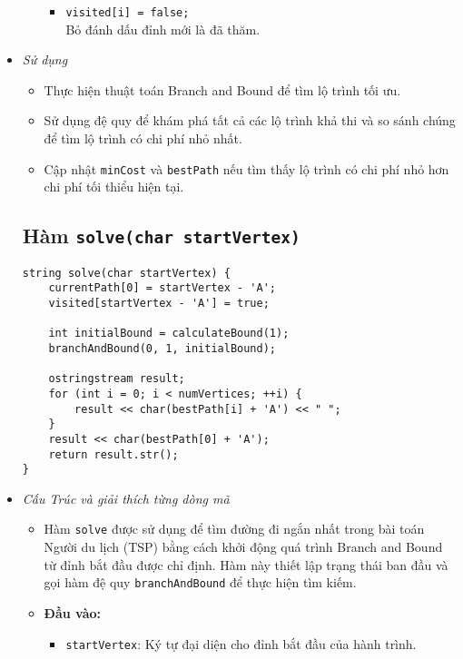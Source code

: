 \documentclass[a4paper]{article}
\begin{document}
\begin{itemize}
\begin{itemize}
\begin{itemize}
        \item \texttt{visited[i] = false;} \\ 
        Bỏ đánh dấu đỉnh mới là đã thăm.
    \end{itemize}
\end{itemize}
\item \textit{Sử dụng}
\begin{itemize}
    \item Thực hiện thuật toán Branch and Bound để tìm lộ trình tối ưu.
    \item Sử dụng đệ quy để khám phá tất cả các lộ trình khả thi và so sánh chúng để tìm lộ trình có chi phí nhỏ nhất.
    \item Cập nhật \texttt{minCost} và \texttt{bestPath} nếu tìm thấy lộ trình có chi phí nhỏ hơn chi phí tối thiểu hiện tại.
\end{itemize}

\subsection*{Hàm \texttt{solve(char startVertex)}}
\begin{lstlisting}[style=cppstyle]
string solve(char startVertex) {
    currentPath[0] = startVertex - 'A';
    visited[startVertex - 'A'] = true;

    int initialBound = calculateBound(1);
    branchAndBound(0, 1, initialBound);

    ostringstream result;
    for (int i = 0; i < numVertices; ++i) {
        result << char(bestPath[i] + 'A') << " ";
    }
    result << char(bestPath[0] + 'A');
    return result.str();
}
\end{lstlisting}
\item \textit{Cấu Trúc và giải thích từng dòng mã}
\begin{itemize}
    \item Hàm \texttt{solve} được sử dụng để tìm đường đi ngắn nhất trong bài toán Người du lịch (TSP) bằng cách khởi động quá trình Branch and Bound từ đỉnh bắt đầu được chỉ định. Hàm này thiết lập trạng thái ban đầu và gọi hàm đệ quy \texttt{branchAndBound} để thực hiện tìm kiếm.
\end{itemize}

\begin{itemize}
    \item \textbf{Đầu vào:}
    \begin{itemize}
        \item \texttt{startVertex}: Ký tự đại diện cho đỉnh bắt đầu của hành trình.
    \end{itemize}


\end{itemize}
\end{itemize}
\end{document}
